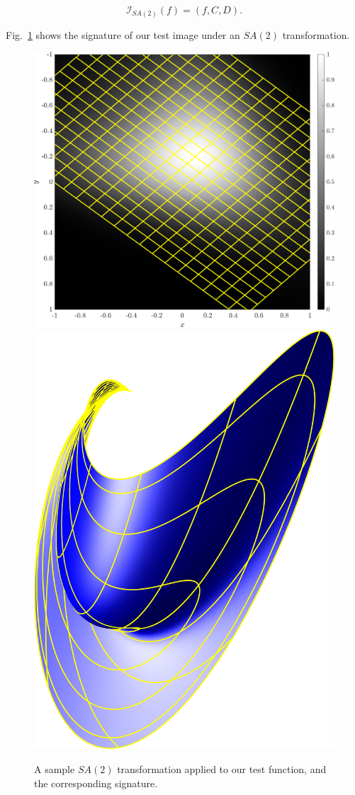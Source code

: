 \documentclass{artjlt}
\begin{document}
\begin{equation}
    \label{eq:SA2signature}
    \mathcal{I}_{SA(2)}(f) = \left(f, C, D \right).
\end{equation}

Fig.~\ref{fig:SA2} shows the signature of our test image under an $SA(2)$ transformation.

\begin{figure}
\centering
\includegraphics[width=.45\textwidth]{Figs/f_transformed_SA2.png}
\includegraphics[width=.45\textwidth]{Figs/SA2_signature.png}
\caption{A sample $SA(2)$ transformation applied to our test function, and the corresponding signature.}
\label{fig:SA2}
\end{figure}
\end{document}

